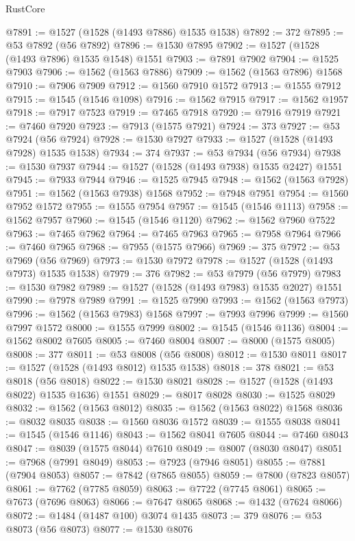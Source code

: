 \begin{lexlean}{RustCore}
\begin{coremodule}
@7891 := @1527 (@1528 (@1493 @7886) @1535 @1538)
@7892 := 372
@7895 := @53 @7892 (@56 @7892)
@7896 := @1530 @7895
@7902 := @1527 (@1528 (@1493 @7896) @1535 @1548) @1551
@7903 := @7891 @7902
@7904 := @1525 @7903
@7906 := @1562 (@1563 @7886)
@7909 := @1562 (@1563 @7896) @1568
@7910 := @7906 @7909
@7912 := @1560 @7910 @1572
@7913 := @1555 @7912
@7915 := @1545 (@1546 @1098)
@7916 := @1562 @7915
@7917 := @1562 @1957
@7918 := @7917 @7523
@7919 := @7465 @7918
@7920 := @7916 @7919
@7921 := @7460 @7920
@7923 := @7913 (@1575 @7921)
@7924 := 373
@7927 := @53 @7924 (@56 @7924)
@7928 := @1530 @7927
@7933 := @1527 (@1528 (@1493 @7928) @1535 @1538)
@7934 := 374
@7937 := @53 @7934 (@56 @7934)
@7938 := @1530 @7937
@7944 := @1527 (@1528 (@1493 @7938) @1535 @2427) @1551
@7945 := @7933 @7944
@7946 := @1525 @7945
@7948 := @1562 (@1563 @7928)
@7951 := @1562 (@1563 @7938) @1568
@7952 := @7948 @7951
@7954 := @1560 @7952 @1572
@7955 := @1555 @7954
@7957 := @1545 (@1546 @1113)
@7958 := @1562 @7957
@7960 := @1545 (@1546 @1120)
@7962 := @1562 @7960 @7522
@7963 := @7465 @7962
@7964 := @7465 @7963
@7965 := @7958 @7964
@7966 := @7460 @7965
@7968 := @7955 (@1575 @7966)
@7969 := 375
@7972 := @53 @7969 (@56 @7969)
@7973 := @1530 @7972
@7978 := @1527 (@1528 (@1493 @7973) @1535 @1538)
@7979 := 376
@7982 := @53 @7979 (@56 @7979)
@7983 := @1530 @7982
@7989 := @1527 (@1528 (@1493 @7983) @1535 @2027) @1551
@7990 := @7978 @7989
@7991 := @1525 @7990
@7993 := @1562 (@1563 @7973)
@7996 := @1562 (@1563 @7983) @1568
@7997 := @7993 @7996
@7999 := @1560 @7997 @1572
@8000 := @1555 @7999
@8002 := @1545 (@1546 @1136)
@8004 := @1562 @8002 @7605
@8005 := @7460 @8004
@8007 := @8000 (@1575 @8005)
@8008 := 377
@8011 := @53 @8008 (@56 @8008)
@8012 := @1530 @8011
@8017 := @1527 (@1528 (@1493 @8012) @1535 @1538)
@8018 := 378
@8021 := @53 @8018 (@56 @8018)
@8022 := @1530 @8021
@8028 := @1527 (@1528 (@1493 @8022) @1535 @1636) @1551
@8029 := @8017 @8028
@8030 := @1525 @8029
@8032 := @1562 (@1563 @8012)
@8035 := @1562 (@1563 @8022) @1568
@8036 := @8032 @8035
@8038 := @1560 @8036 @1572
@8039 := @1555 @8038
@8041 := @1545 (@1546 @1146)
@8043 := @1562 @8041 @7605
@8044 := @7460 @8043
@8047 := @8039 (@1575 @8044) @7610
@8049 := @8007 (@8030 @8047)
@8051 := @7968 (@7991 @8049)
@8053 := @7923 (@7946 @8051)
@8055 := @7881 (@7904 @8053)
@8057 := @7842 (@7865 @8055)
@8059 := @7800 (@7823 @8057)
@8061 := @7762 (@7785 @8059)
@8063 := @7722 (@7745 @8061)
@8065 := @7673 (@7696 @8063)
@8066 := @7647 @8065
@8068 := @1432 (@7624 @8066)
@8072 := @1484 (@1487 @100) @3074 @1435
@8073 := 379
@8076 := @53 @8073 (@56 @8073)
@8077 := @1530 @8076

\end{coremodule}
\end{lexlean}
